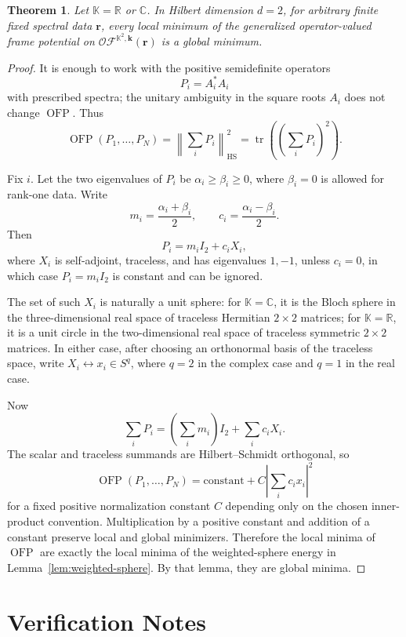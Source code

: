 \documentclass[11pt]{article}
\newtheorem{theorem}{Theorem}
\newcommand{\R}{\mathbb R}
\newcommand{\C}{\mathbb C}
\newcommand{\K}{\mathbb K}
\newcommand{\tr}{\operatorname{tr}}
\newcommand{\OFP}{\operatorname{OFP}}
\begin{document}
\begin{theorem}\label{thm:d2}
Let \(\K=\R\) or \(\C\). In Hilbert dimension \(d=2\), for arbitrary finite fixed spectral data \(\mathbf r\), every local minimum of the generalized operator-valued frame potential on \(\mathcal{OF}^{\K^2,\mathbf k}(\mathbf r)\) is a global minimum.
\end{theorem}

\begin{proof}
It is enough to work with the positive semidefinite operators
\[
        P_i=A_i^*A_i
\]
with prescribed spectra; the unitary ambiguity in the square roots \(A_i\) does not change \(\OFP\). Thus
\[
        \OFP(P_1,\ldots,P_N)=\left\|\sum_i P_i\right\|_{\mathrm{HS}}^2
        =\tr\left(\left(\sum_i P_i\right)^2\right).
\]

Fix \(i\). Let the two eigenvalues of \(P_i\) be \(\alpha_i\ge \beta_i\ge 0\), where \(\beta_i=0\) is allowed for rank-one data. Write
\[
        m_i=\frac{\alpha_i+\beta_i}{2},
        \qquad
        c_i=\frac{\alpha_i-\beta_i}{2}.
\]
Then
\[
        P_i=m_i I_2+c_i X_i,
\]
where \(X_i\) is self-adjoint, traceless, and has eigenvalues \(1,-1\), unless \(c_i=0\), in which case \(P_i=m_iI_2\) is constant and can be ignored.

The set of such \(X_i\) is naturally a unit sphere: for \(\K=\C\), it is the Bloch sphere in the three-dimensional real space of traceless Hermitian \(2\times2\) matrices; for \(\K=\R\), it is a unit circle in the two-dimensional real space of traceless symmetric \(2\times2\) matrices. In either case, after choosing an orthonormal basis of the traceless space, write \(X_i\leftrightarrow x_i\in S^q\), where \(q=2\) in the complex case and \(q=1\) in the real case.

Now
\[
        \sum_i P_i=\left(\sum_i m_i\right)I_2+\sum_i c_iX_i.
\]
The scalar and traceless summands are Hilbert--Schmidt orthogonal, so
\[
        \OFP(P_1,\ldots,P_N)
        =
        \text{constant}
        +
        C\left|\sum_i c_i x_i\right|^2
\]
for a fixed positive normalization constant \(C\) depending only on the chosen inner-product convention. Multiplication by a positive constant and addition of a constant preserve local and global minimizers. Therefore the local minima of \(\OFP\) are exactly the local minima of the weighted-sphere energy in Lemma~\ref{lem:weighted-sphere}. By that lemma, they are global minima.
\end{proof}

\section*{Verification Notes}
\end{document}
